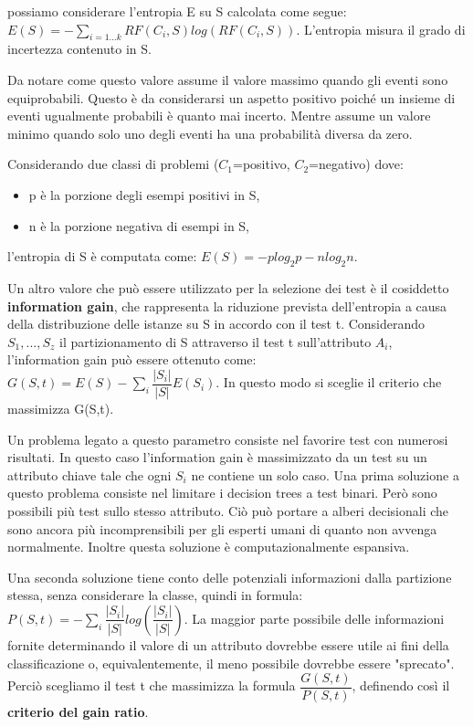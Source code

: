 \documentclass[a4paper]{extarticle}
\begin{document}
possiamo considerare l'entropia E su S calcolata come segue: $E(S) = -\sum_{i=1...k} RF(C_i,S)log(RF(C_i,S))$. L'entropia misura il grado di incertezza contenuto in S.

Da notare come questo valore assume il valore massimo quando gli eventi sono equiprobabili. Questo è da considerarsi un aspetto positivo poiché un insieme di eventi ugualmente probabili è quanto mai incerto. Mentre assume un valore minimo quando solo uno degli eventi ha una probabilità diversa da zero.

Considerando due classi di problemi ($C_1$=positivo, $C_2$=negativo) dove:
\begin{itemize}
\item p è la porzione degli esempi positivi in S,
\item n è la porzione negativa di esempi in S,
\end{itemize}

l'entropia di S è computata come: $E(S) = -p log_2 p - n log_2 n$.

Un altro valore che può essere utilizzato per la selezione dei test è il cosiddetto \textbf{information gain}, che rappresenta la riduzione prevista dell'entropia a causa della distribuzione delle istanze su S in accordo con il test t. Considerando $S_1,...,S_z$ il partizionamento di S attraverso il test t sull'attributo $A_i$, l'information gain può essere ottenuto come: $G(S,t) = E(S) - \sum_i \dfrac{|S_i|}{|S|}E(S_i)$. In questo modo si sceglie il criterio che massimizza G(S,t).

Un problema legato a questo parametro consiste nel favorire test con numerosi risultati. In questo caso l'information gain è massimizzato da un test su un attributo chiave tale che ogni $S_i$ ne contiene un solo caso. Una prima soluzione a questo problema consiste nel limitare i decision trees a test binari. Però sono possibili più test sullo stesso attributo. Ciò può portare a alberi decisionali che sono ancora più incomprensibili per gli esperti umani di quanto non avvenga normalmente. Inoltre questa soluzione è computazionalmente espansiva.

Una seconda soluzione tiene conto delle potenziali informazioni dalla partizione stessa, senza considerare la classe, quindi in formula: $P(S,t) = - \sum_i \dfrac{|S_i|}{|S|} log(\dfrac{|S_i|}{|S|})$. La maggior parte possibile delle informazioni fornite determinando il valore di un attributo dovrebbe essere utile ai fini della classificazione o, equivalentemente, il meno possibile dovrebbe essere "sprecato". Perciò scegliamo il test t che massimizza la formula $\dfrac{G(S,t)}{P(S,t)}$, definendo così il \textbf{criterio del gain ratio}.
\end{document}
